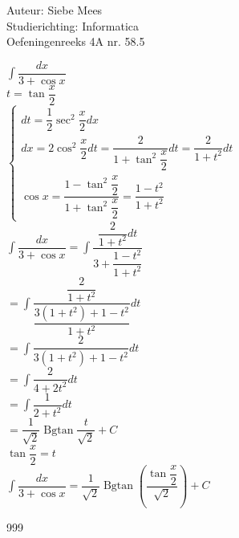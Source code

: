\documentclass[a4paper]{article}
\newcommand{\Bgtan}{\operatorname{Bgtan}}
\begin{document}
  
\noindent \large Auteur: Siebe Mees \\
\noindent \large Studierichting: Informatica\\
\noindent \large Oefeningenreeks 4A nr. 58.5\\

\medskip

\normalsize

$ \displaystyle\int \dfrac{dx}{3 + \cos x} $\\

$ t = \tan \dfrac{x}{2} $\\

$ \left \{
\begin{array}{l}

dt = \dfrac{1}{2}\sec^2 \dfrac{x}{2} dx \\

dx = 2\cos^2 \dfrac{x}{2} dt = \dfrac{2}{1 + \tan^2 \dfrac{x}{2}} dt = \dfrac{2}{1 + t^2} dt \\

\cos x = \dfrac{1 - \tan^2 \dfrac{x}{2}}{1 + \tan^2 \dfrac{x}{2}} = \dfrac{1 - t^2}{1 + t^2}
\end{array}
\right . $\\

$ \displaystyle\int \dfrac{dx}{3 + \cos x} = \displaystyle\int \dfrac{\dfrac{2}{1 + t^2} dt}{3 + \dfrac{1 - t^2}{1 + t^2}} $\\

$ = \displaystyle\int \dfrac{\dfrac{2}{1 + t^2}}{\dfrac{3\left( 1 + t^2 \right) + 1 - t^2}{1 + t^2}} dt $\\

$ = \displaystyle\int \dfrac{2}{3\left( 1 + t^2 \right) + 1 - t^2} dt $\\

$ = \displaystyle\int \dfrac{2}{4 + 2t^2} dt $\\

$ = \displaystyle\int \dfrac{1}{2 + t^2} dt $\\

$ = \dfrac{1}{\sqrt{2}} \Bgtan \dfrac{t}{\sqrt{2}} + C $\\

$ \tan \dfrac{x}{2} = t $\\

$ \displaystyle\int \dfrac{dx}{3 + \cos x} = \dfrac{1}{\sqrt{2}} \Bgtan \left( \dfrac{\tan \dfrac{x}{2}}{\sqrt{2}} \right) + C $\\

\begin{thebibliography}{999}
\end{thebibliography}
\end{document}
